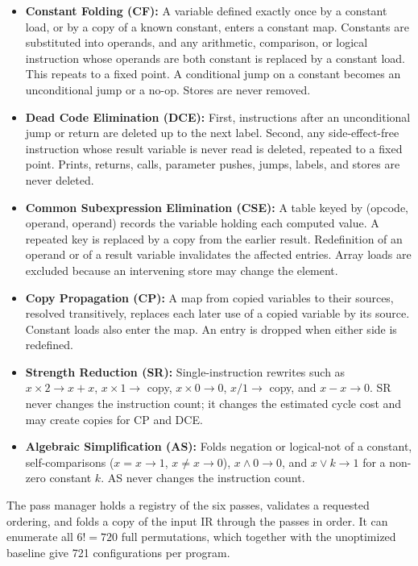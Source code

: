 \documentclass[conference]{IEEEtran}
\begin{document}
\begin{itemize}
    \item \textbf{Constant Folding (CF):} A variable defined exactly once by a constant load, or by a copy of a known constant, enters a constant map. Constants are substituted into operands, and any arithmetic, comparison, or logical instruction whose operands are both constant is replaced by a constant load. This repeats to a fixed point. A conditional jump on a constant becomes an unconditional jump or a no-op. Stores are never removed.
    \item \textbf{Dead Code Elimination (DCE):} First, instructions after an unconditional jump or return are deleted up to the next label. Second, any side-effect-free instruction whose result variable is never read is deleted, repeated to a fixed point. Prints, returns, calls, parameter pushes, jumps, labels, and stores are never deleted.
    \item \textbf{Common Subexpression Elimination (CSE):} A table keyed by (opcode, operand, operand) records the variable holding each computed value. A repeated key is replaced by a copy from the earlier result. Redefinition of an operand or of a result variable invalidates the affected entries. Array loads are excluded because an intervening store may change the element.
    \item \textbf{Copy Propagation (CP):} A map from copied variables to their sources, resolved transitively, replaces each later use of a copied variable by its source. Constant loads also enter the map. An entry is dropped when either side is redefined.
    \item \textbf{Strength Reduction (SR):} Single-instruction rewrites such as $x \times 2 \to x + x$, $x \times 1 \to$ copy, $x \times 0 \to 0$, $x / 1 \to$ copy, and $x - x \to 0$. SR never changes the instruction count; it changes the estimated cycle cost and may create copies for CP and DCE.
    \item \textbf{Algebraic Simplification (AS):} Folds negation or logical-not of a constant, self-comparisons ($x = x \to 1$, $x \neq x \to 0$), $x \wedge 0 \to 0$, and $x \vee k \to 1$ for a non-zero constant $k$. AS never changes the instruction count.
\end{itemize}

The pass manager holds a registry of the six passes, validates a requested ordering, and folds a copy of the input IR through the passes in order. It can enumerate all $6! = 720$ full permutations, which together with the unoptimized baseline give 721 configurations per program.
\end{document}
